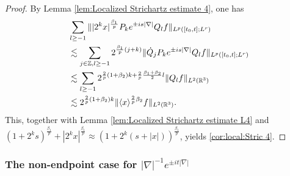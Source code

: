 \documentclass[11pt,twoside]{article}
\def\Z{\mathop{\mathbb Z\kern 0pt}\nolimits}
\def\R{\mathop{\mathbb R\kern 0pt}\nolimits}
\def\f{\frac}
\def\ls{\lesssim}
\newcommand{\w}[1]{\langle {#1} \rangle}
\newcommand{\q}{\dot{Q}}
\theoremstyle{plain}
\theoremstyle{definition}
\numberwithin{equation}{section}
\begin{document}
	\begin{proof}
		By Lemma \ref{lem:Localized Strichartz estimate 4}, one has
		\begin{equation*}
			\begin{split}
				&\sum_{l\ge-1}\||2^kx|^{\f{\beta_1}{p}}P_{k}e^{\pm is|\nabla|}Q_lf\|_{L^p([t_0,t];L^r)}\\
				&\ls
				\sum_{j\in\Z,l\ge-1}2^{\f{\beta_1}{p} (j+k)}\|\q_jP_{k}e^{\pm is|\nabla|}Q_lf\|_{L^p([t_0,t];L^r)}\\
				&\ls
				\sum_{l\ge-1}2^{\f2p(1+\beta_2)k +  \f2p\f{\beta_1+\beta_2}{2} l}\|Q_lf\|_{L^2(\R^3)}\\
				&\ls
				2^{\f2p(1+\beta_2)k }\|\w{x}^{\f{2}{p}\beta_2}f\|_{L^2(\R^3)}.
			\end{split}
		\end{equation*}
		This, together with Lemma \ref{lem:Localized Strichartz estimate L4} and
$(1+2^ks)^{\f{\beta_1}{p}}+|2^kx|^{\f{\beta_1}{p}}\approx(1+2^k(s+|x|))^{\f{\beta_1}{p}}$,  yields \eqref{cor:local:Stric 4}.
	\end{proof}

	\subsubsection{The non-endpoint case for $|\nabla|^{-1}e^{\pm it|\nabla|}$}
\end{document}
